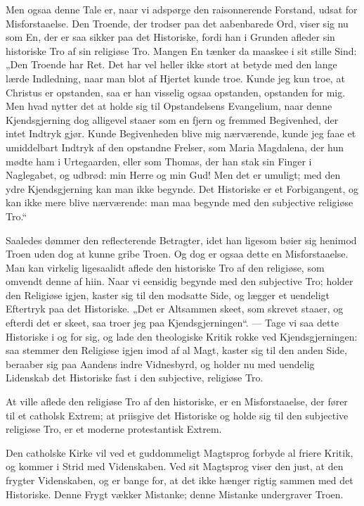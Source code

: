 \documentclass[12pt,a4paper]{book}
\newcommand{\opage}[1]{\marginnote{\footnotesize\textit{[#1]}}}
\begin{document}
Men ogsaa denne Tale er, naar vi adspørge den raisonnerende Forstand, udsat for
Misforstaaelse. Den Troende, der trodser paa det aabenbarede Ord, viser sig nu
som En, der er saa sikker paa det Historiske, fordi han i Grunden afleder sin
historiske Tro af sin religiøse Tro. Mangen En tænker da maaskee i sit stille
Sind: „Den Troende har Ret. Det har vel heller ikke stort at betyde med den
lange lærde Indledning, naar man blot af Hjertet kunde troe. Kunde jeg kun
troe, at Christus er opstanden, saa er han visselig ogsaa opstanden, opstanden
for mig. Men hvad nytter det at holde sig til Opstandelsens Evangelium, naar
denne Kjendsgjerning dog alligevel staaer som en fjern og fremmed Begivenhed,
der intet Indtryk gjør. Kunde Begivenheden blive mig nærværende, kunde jeg faae
et umiddelbart Indtryk af
\opage{17} den opstandne Frelser, som Maria Magdalena, der hun mødte ham i Urtegaarden,
eller som Thomas, der han stak sin Finger i Naglegabet, og udbrød: min Herre og
min Gud! Men det er umuligt; med den ydre Kjendsgjerning kan man ikke begynde.
Det Historiske er et Forbigangent, og kan ikke mere blive nærværende: man maa
begynde med den subjective religiøse Tro.“

Saaledes dømmer den reflecterende Betragter, idet han ligesom bøier sig henimod
Troen uden dog at kunne gribe Troen. Og dog er ogsaa dette en Misforstaaelse.
Man kan virkelig ligesaalidt aflede den historiske Tro af den religiøse, som
omvendt denne af hiin. Naar vi eensidig begynde med den subjective Tro; holder
den Religiøse igjen, kaster sig til den modsatte Side, og lægger et uendeligt
Eftertryk paa det Historiske. „Det er Altsammen skeet, som skrevet staaer, og
efterdi det er skeet, saa troer jeg paa Kjendsgjerningen“. --- Tage vi saa dette
Historiske i og for sig, og lade den theologiske Kritik rokke ved
Kjendsgjerningen: saa stemmer den Religiøse igjen imod af al Magt, kaster sig
til den anden Side, beraaber sig paa Aandens indre Vidnesbyrd, og holder nu med
uendelig Lidenskab det Historiske fast i den subjective, religiøse Tro.

At ville aflede den religiøse Tro af den historiske, er en Misforstaaelse, der
fører til et catholsk Extrem; at priisgive det Historiske og holde sig til den
subjective religiøse Tro, er et moderne protestantisk Extrem.

Den catholske Kirke vil ved et guddommeligt Magtsprog forbyde al friere Kritik,
og kommer i Strid med Videnskaben. Ved sit Magtsprog viser den just, at den
frygter Videnskaben, og er bange for, at det ikke hænger rigtig sammen med det
Historiske. Denne Frygt vækker Mistanke; denne Mistanke undergraver Troen.
\end{document}
